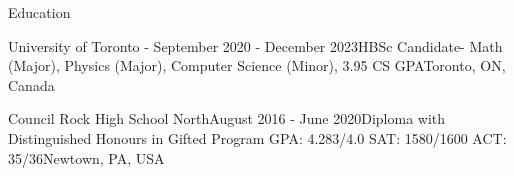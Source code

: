 \documentclass[UTF8]{resume} %
\begin{document}
\begin{rSection}{Education}

\begin{rSubsection}{University of Toronto - }{September 2020 - December 2023}{HBSc Candidate- Math (Major), Physics (Major), Computer Science (Minor), 3.95 CS GPA}{Toronto, ON, Canada}
\end{rSubsection}
\begin{rSubsection}{Council Rock High School North}{August 2016 - June 2020}{Diploma with Distinguished Honours in Gifted Program GPA: 4.283/4.0  SAT: 1580/1600  ACT: 35/36}{Newtown, PA, USA}
    \end{rSubsection}
\end{rSection}
\end{document}
